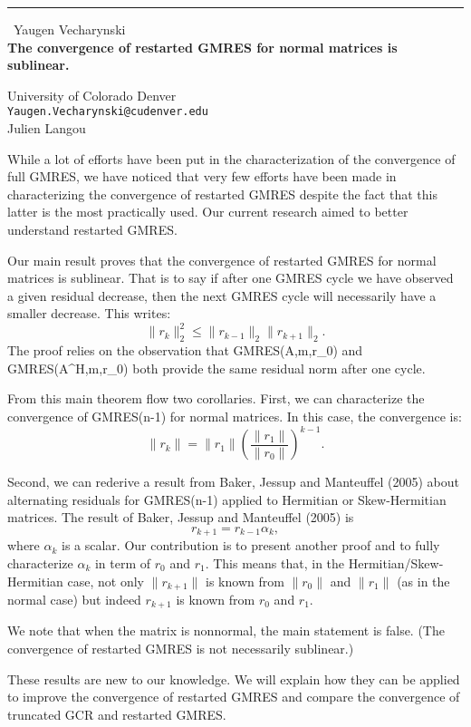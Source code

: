 \documentclass{report}
\begin{document}
\begin{center}
\rule{6in}{1pt} \
{\large Yaugen Vecharynski \\
{\bf The convergence of restarted GMRES for normal matrices is sublinear.}}

University of Colorado Denver
\\
{\tt Yaugen.Vecharynski@cudenver.edu}\\
Julien Langou\end{center}

While a lot of efforts have been put in the characterization of the
convergence of full GMRES, we have noticed that very few efforts have
been made in characterizing the convergence of restarted GMRES despite
the fact that this latter is the most practically used. Our current
research aimed to better understand restarted GMRES.

Our main result proves that the convergence of restarted GMRES for normal
matrices is sublinear. That is to say if after one GMRES cycle we have
observed a given residual decrease, then the next GMRES cycle will
necessarily have a smaller decrease. This writes:
$$ \| r_k \|_2^2 \leq \| r_{k-1} \|_2 \|r_{k+1} \|_2. $$
The proof relies on the observation that GMRES(A,m,r_0) and
GMRES(A^H,m,r_0) both provide the same residual norm after one cycle.

From this main theorem flow two corollaries. First, we can characterize
the convergence of GMRES(n-1) for normal matrices. In this case, the
convergence is:
$$ \| r_k \| = \| r_1 \| \left( \frac{ \|r_1\| } { \| r_0 \| } \right)^{k-1} .$$

Second, we can rederive a result from Baker, Jessup and Manteuffel (2005)
about alternating residuals for GMRES(n-1) applied to Hermitian or
Skew-Hermitian matrices. The result of Baker, Jessup and Manteuffel
(2005) is
$$ r_{k+1} = r_{k-1} \alpha_k,$$
where $\alpha_k$ is a scalar.
Our contribution is to present another proof and to fully characterize
$\alpha_k$ in term of $r_0$ and $r_1$. This means that, in the
Hermitian/Skew-Hermitian case, not only $ \| r_{k+1} \|$ is known from
$\|r_0\|$ and $\|r_1\|$ (as in the normal case) but indeed $ r_{k+1} $ is
known from $r_0$ and $r_1$.

We note that when the matrix is nonnormal, the main statement is false.
(The convergence of restarted GMRES is not necessarily sublinear.)

These results are new to our knowledge. We will explain how they can be
applied to improve the convergence of restarted GMRES and compare the
convergence of truncated GCR and restarted GMRES.
\end{document}

